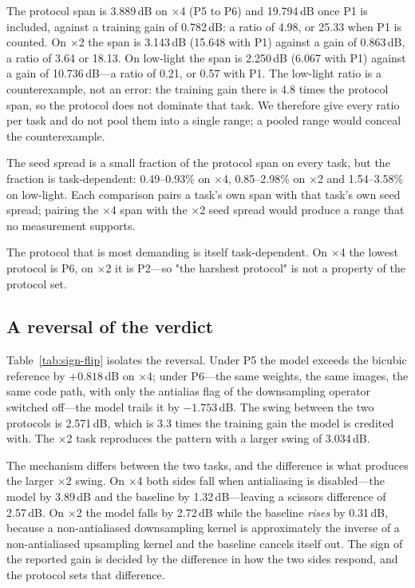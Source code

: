 \documentclass[10pt,twocolumn]{article}
\begin{document}
The protocol span is 3.889\,dB on $\times$4 (P5 to P6) and 19.794\,dB once
P1 is included, against a training gain of 0.782\,dB: a ratio of 4.98, or
25.33 when P1 is counted. On $\times$2 the span is 3.143\,dB (15.648 with
P1) against a gain of 0.863\,dB, a ratio of 3.64 or 18.13. On low-light the
span is 2.250\,dB (6.067 with P1) against a gain of 10.736\,dB---a ratio of
0.21, or 0.57 with P1. The low-light ratio is a counterexample, not an
error: the training gain there is 4.8 times the protocol span, so the
protocol does not dominate that task. We therefore give every ratio per
task and do not pool them into a single range; a pooled range would conceal
the counterexample.

The seed spread is a small fraction of the protocol span on every task,
but the fraction is task-dependent: 0.49--0.93\% on $\times$4, 0.85--2.98\%
on $\times$2 and 1.54--3.58\% on low-light. Each comparison pairs a task's
own span with that task's own seed spread; pairing the $\times$4 span with
the $\times$2 seed spread would produce a range that no measurement
supports.

The protocol that is most demanding is itself task-dependent. On $\times$4
the lowest protocol is P6, on $\times$2 it is P2---so "the harshest
protocol" is not a property of the protocol set.

\subsection{A reversal of the verdict}

Table~\ref{tab:sign-flip} isolates the reversal. Under P5 the model exceeds
the bicubic reference by $+0.818$\,dB on $\times$4; under P6---the same
weights, the same images, the same code path, with only the antialias flag
of the downsampling operator switched off---the model trails it by
$-1.753$\,dB. The swing between the two protocols is 2.571\,dB, which is
3.3 times the training gain the model is credited with. The $\times$2 task
reproduces the pattern with a larger swing of 3.034\,dB.



The mechanism differs between the two tasks, and the difference is what
produces the larger $\times$2 swing. On $\times$4 both sides fall when
antialiasing is disabled---the model by 3.89\,dB and the baseline by
1.32\,dB---leaving a scissors difference of 2.57\,dB. On $\times$2 the
model falls by 2.72\,dB while the baseline \emph{rises} by 0.31\,dB,
because a non-antialiased downsampling kernel is approximately the inverse
of a non-antialiased upsampling kernel and the baseline cancels itself out.
The sign of the reported gain is decided by the difference in how the two
sides respond, and the protocol sets that difference.
\end{document}
